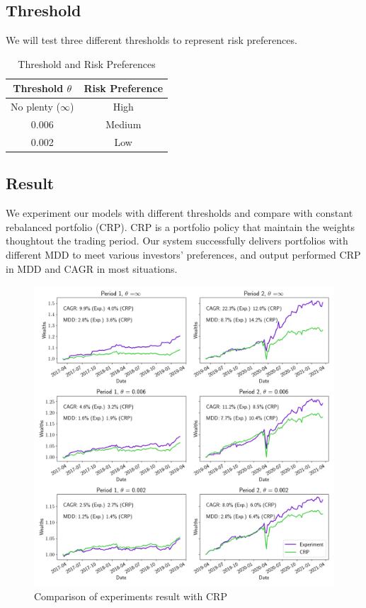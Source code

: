 \subsection{Threshold}
We will test three different thresholds to represent risk preferences.  
\begin{table}[htb]
    \centering
    \begin{tabular}{||c|c||}
    \hline \hline
    Threshold $\theta$ & Risk Preference \\ \hline
    No plenty ($\infty$) & High \\ \hline
    0.006 & Medium      \\ \hline
    0.002 & Low      \\ \hline    
    \hline \hline
    \end{tabular}
    \caption{Threshold and Risk Preferences}
    \label{tab:threshold}
\end{table}
\subsection{Result}
We experiment our models with different thresholds and compare with constant rebalanced portfolio (CRP). 
CRP is a portfolio policy that maintain the weights thoughtout the trading period. 
Our system successfully delivers portfolios with different MDD to meet various investors' preferences, and output performed CRP in MDD and CAGR in most situations.

\begin{figure}[htb]
\centering
  \includegraphics[width=16cm]{images/crp_compare.png}
  \caption [Comparison of experiments result with CRP]{Comparison of experiments result with CRP}
  \label{fig:crp_compare}
\end{figure}